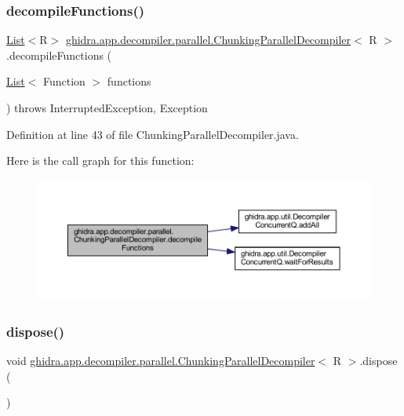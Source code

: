 \subsubsection{\texorpdfstring{decompileFunctions()}{decompileFunctions()}}
{\footnotesize\ttfamily \mbox{\hyperlink{xml_8hh_ab5ab62f46b3735557c125f91b40ac155}{List}}$<$R$>$ \mbox{\hyperlink{classghidra_1_1app_1_1decompiler_1_1parallel_1_1_chunking_parallel_decompiler}{ghidra.\+app.\+decompiler.\+parallel.\+Chunking\+Parallel\+Decompiler}}$<$ R $>$.decompile\+Functions (\begin{DoxyParamCaption}\item[{\mbox{\hyperlink{xml_8hh_ab5ab62f46b3735557c125f91b40ac155}{List}}$<$ Function $>$}]{functions }\end{DoxyParamCaption}) throws Interrupted\+Exception, 			Exception\hspace{0.3cm}{\ttfamily [inline]}}



Definition at line 43 of file Chunking\+Parallel\+Decompiler.\+java.

Here is the call graph for this function\+:
\nopagebreak
\begin{figure}[H]
\begin{center}
\leavevmode
\includegraphics[width=350pt]{classghidra_1_1app_1_1decompiler_1_1parallel_1_1_chunking_parallel_decompiler_ac760e3d948a31682f714537defee507f_cgraph}
\end{center}
\end{figure}
\mbox{\label{classghidra_1_1app_1_1decompiler_1_1parallel_1_1_chunking_parallel_decompiler_a3035ca3f34788eeecfad2b5f1116d0e4}} 
\subsubsection{\texorpdfstring{dispose()}{dispose()}}
{\footnotesize\ttfamily void \mbox{\hyperlink{classghidra_1_1app_1_1decompiler_1_1parallel_1_1_chunking_parallel_decompiler}{ghidra.\+app.\+decompiler.\+parallel.\+Chunking\+Parallel\+Decompiler}}$<$ R $>$.dispose (\begin{DoxyParamCaption}{ }\end{DoxyParamCaption})\hspace{0.3cm}{\ttfamily [inline]}}




